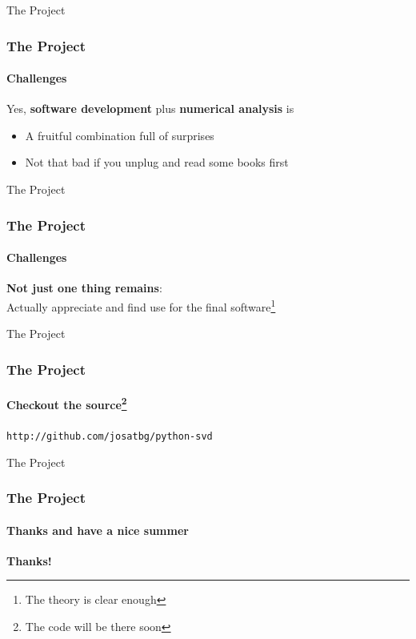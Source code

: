 \documentclass{beamer}
\begin{document}

\begin{frame}{The Project}

\frametitle{The Project}
\framesubtitle{Challenges}

Yes, \textbf{software development} plus \textbf{numerical analysis} is 
\begin{itemize}
\item A fruitful combination full of surprises
\item Not that bad if you unplug and read some books first
\end{itemize}

\end{frame}


\begin{frame}{The Project}

\frametitle{The Project}
\framesubtitle{Challenges}

\textbf{Not just one thing remains}:\\
Actually appreciate and find use for the final software\footnote{The theory is clear enough}

\end{frame}


\begin{frame}{The Project}

\frametitle{The Project}
\framesubtitle{Checkout the source\footnote{The code will be there soon}}

\begin{center}
\texttt{http://github.com/josatbg/python-svd}
\end{center}

\end{frame}


\begin{frame}{The Project}

\frametitle{The Project}
\framesubtitle{Thanks and have a nice summer}

\begin{center}
\textbf{Thanks!}
\end{center}

\end{frame}

\end{document}
